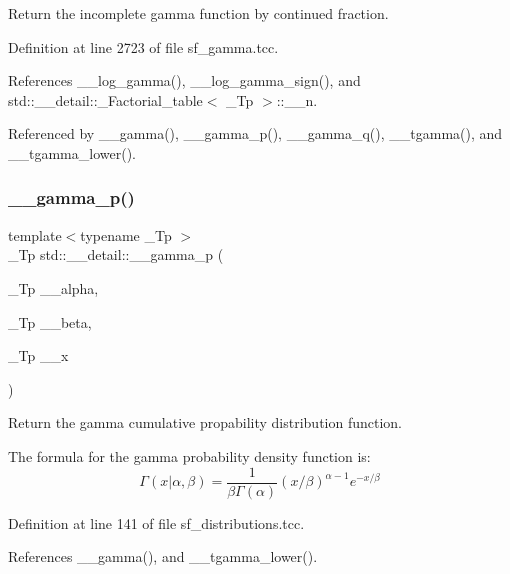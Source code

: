 Return the incomplete gamma function by continued fraction. 



Definition at line 2723 of file sf\+\_\+gamma.\+tcc.



References \+\_\+\+\_\+log\+\_\+gamma(), \+\_\+\+\_\+log\+\_\+gamma\+\_\+sign(), and std\+::\+\_\+\+\_\+detail\+::\+\_\+\+Factorial\+\_\+table$<$ \+\_\+\+Tp $>$\+::\+\_\+\+\_\+n.



Referenced by \+\_\+\+\_\+gamma(), \+\_\+\+\_\+gamma\+\_\+p(), \+\_\+\+\_\+gamma\+\_\+q(), \+\_\+\+\_\+tgamma(), and \+\_\+\+\_\+tgamma\+\_\+lower().

\mbox{\label{namespacestd_1_1____detail_a33f9cf005ecdad199024712cc89c0bc6}} 
\subsubsection{\texorpdfstring{\+\_\+\+\_\+gamma\+\_\+p()}{\_\_gamma\_p()}\hspace{0.1cm}{\footnotesize\ttfamily [1/2]}}
{\footnotesize\ttfamily template$<$typename \+\_\+\+Tp $>$ \\
\+\_\+\+Tp std\+::\+\_\+\+\_\+detail\+::\+\_\+\+\_\+gamma\+\_\+p (\begin{DoxyParamCaption}\item[{\+\_\+\+Tp}]{\+\_\+\+\_\+alpha,  }\item[{\+\_\+\+Tp}]{\+\_\+\+\_\+beta,  }\item[{\+\_\+\+Tp}]{\+\_\+\+\_\+x }\end{DoxyParamCaption})}



Return the gamma cumulative propability distribution function. 

The formula for the gamma probability density function is\+: \[ \Gamma(x|\alpha,\beta) = \frac{1}{\beta\Gamma(\alpha)} (x/\beta)^{\alpha - 1} e^{-x/\beta} \] 

Definition at line 141 of file sf\+\_\+distributions.\+tcc.



References \+\_\+\+\_\+gamma(), and \+\_\+\+\_\+tgamma\+\_\+lower().



